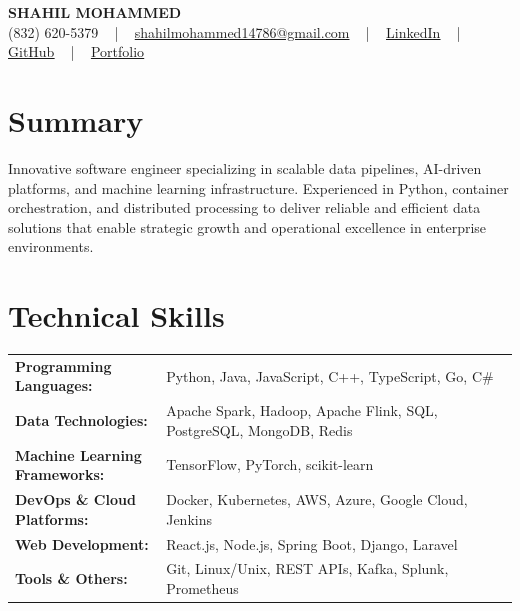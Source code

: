 \documentclass[letterpaper,11pt]{article}
\begin{document}
\begin{center}
    {\fontsize{14pt}{12pt}\selectfont \textbf{\MakeUppercase{Shahil Mohammed}}}\\ \vspace{2pt}
    \fontsize{10pt}{12pt}\selectfont (832) 620-5379 ~ | ~ \href{mailto:shahilmohammed14786@gmail.com}{shahilmohammed14786@gmail.com} ~ | ~  
    \href{https://www.linkedin.com/in/shahil-mohammed-9652931a1/}{\color{blue}\underline{LinkedIn}}  ~ | ~ 
    \href{https://github.com/freakbeast14}{\color{blue}\underline{GitHub}} ~ | ~ 
    \href{https://shahil-mohammed.netlify.app/}{\color{blue}\underline{Portfolio}}
    \vspace{-8pt}
\end{center}

\section{Summary}
\fontsize{9pt}{10pt}\selectfont
Innovative software engineer specializing in scalable data pipelines, AI-driven platforms, and machine learning infrastructure. Experienced in Python, container orchestration, and distributed processing to deliver reliable and efficient data solutions that enable strategic growth and operational excellence in enterprise environments.
 \vspace{-5pt}
 
\section{Technical Skills}
        \vspace{-14pt}
        \begin{table}[h]
            \fontsize{9pt}{10pt}\selectfont
            \begin{tabular}{p{0.3\linewidth} p{0.7\linewidth}}
                \textbf{Programming Languages:} & Python, Java, JavaScript, C++, TypeScript, Go, C\# \\
                \textbf{Data Technologies:} & Apache Spark, Hadoop, Apache Flink, SQL, PostgreSQL, MongoDB, Redis \\
                \textbf{Machine Learning Frameworks:} & TensorFlow, PyTorch, scikit-learn \\
                \textbf{DevOps \& Cloud Platforms:} & Docker, Kubernetes, AWS, Azure, Google Cloud, Jenkins \\
                \textbf{Web Development:} & React.js, Node.js, Spring Boot, Django, Laravel \\
                \textbf{Tools \& Others:} & Git, Linux/Unix, REST APIs, Kafka, Splunk, Prometheus \\
            \end{tabular}
        \end{table}
 \vspace{-15pt}
 
\end{document}
